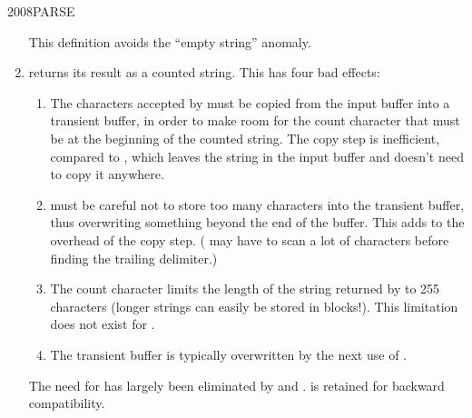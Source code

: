 \begin{worddef}{2008}{PARSE}
\begin{rationale}
\begin{enumerate}
			This definition avoids the ``empty string'' anomaly.

		\item {} returns its result as a counted string.
			This has four bad effects:

			\begin{enumerate}
			\item The characters accepted by  must be
				copied from the input buffer into a transient buffer,
				in order to make room for the count character that
				must be at the beginning of the counted string. The
				copy step is inefficient, compared to ,
				which leaves the string in the input buffer and doesn't
				need to copy it anywhere.

			\item {} must be careful not to store too many
				characters into the transient buffer, thus overwriting
				something beyond the end of the buffer. This adds to
				the overhead of the copy step. ( may have
				to scan a lot of characters before finding the trailing
				delimiter.)

			\item The count character limits the length of the string
				returned by  to 255 characters (longer
				strings can easily be stored in blocks!). This
				limitation does not exist for .

			\item The transient buffer is typically overwritten by the
				next use of .
			\end{enumerate}

			The need for  has largely been eliminated by
			 and .  is
			retained for backward compatibility.
		\end{enumerate}
	\end{rationale}
\end{worddef}

